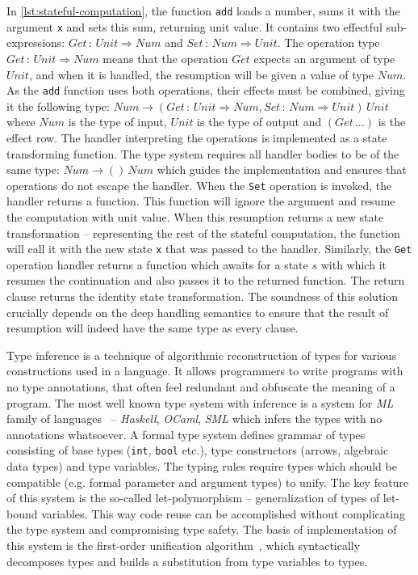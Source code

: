 \documentclass[inz, english, longabstract]{iithesis}
\begin{document}
In \autoref{lst:stateful-computation}, the function \texttt{add} loads a number, sums it with the argument \texttt{x} and sets this sum, returning unit value.
It contains two effectful sub-expressions: $Get \, : \, Unit \Rightarrow Num$ and $Set \, : \, Num \Rightarrow Unit$.
The operation type $Get \, : \, Unit \Rightarrow Num$ means that the operation $Get$ expects an argument of type $Unit$, and when it is handled, the resumption will be given a value of type $Num$.
As the \texttt{add} function uses both operations, their effects must be combined, giving it the following type: $Num \rightarrow (Get \, : \, Unit \Rightarrow Num , Set \, : \, Num \Rightarrow Unit) \, Unit$ where $Num$ is the type of input, $Unit$ is the type of output and $(Get \, \ldots)$ is the effect row.
The handler interpreting the operations is implemented as a state transforming function.
The type system requires all handler bodies to be of the same type: $Num \rightarrow () \, Num$ which guides the implementation and ensures that operations do not escape the handler.
When the \texttt{Set} operation is invoked, the handler returns a function.
This function will ignore the argument and resume the computation with unit value.
When this resumption returns a new state transformation -- representing the rest of the stateful computation, the function will call it with the new state \texttt{x} that was passed to the handler.
Similarly, the \texttt{Get} operation handler returns a function which awaits for a state $s$ with which it resumes the continuation and also passes it to the returned function.
The return clause returns the identity state transformation.
The soundness of this solution crucially depends on the deep handling semantics to ensure that the result of resumption will indeed have the same type as every clause.

Type inference is a technique of algorithmic reconstruction of types for various constructions used in a language.
It allows programmers to write programs with no type annotations, that often feel redundant and obfuscate the meaning of a program.
The most well known type system with inference is a system for \emph{ML} family of languages~\cite{Pierce2002} -- \emph{Haskell}, \emph{OCaml}, \emph{SML} which infers the types with no annotations whatsoever.
A formal type system defines grammar of types consisting of base types (\texttt{int}, \texttt{bool} etc.), type constructors (arrows, algebraic data types) and type variables.
The typing rules require types which should be compatible (e.g. formal parameter and argument types) to unify.
The key feature of this system is the so-called let-polymorphism -- generalization of types of let-bound variables.
This way code reuse can be accomplished without complicating the type system and compromising type safety.
The basis of implementation of this system is the first-order unification algorithm~\cite{Pierce2002}, which syntactically decomposes types and builds a substitution from type variables to types.
\end{document}
